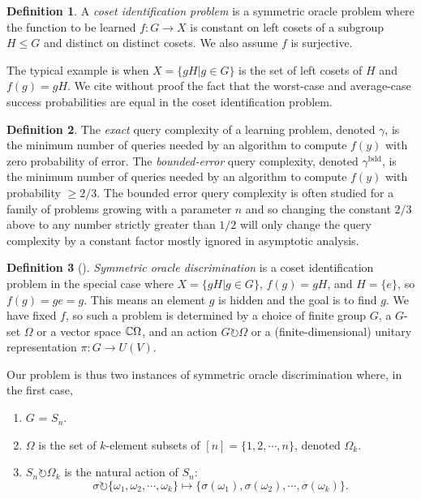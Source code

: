 \documentclass[12pt,twoside]{reedthesis}
\theoremstyle{plain}   %
\theoremstyle{definition}
\newtheorem{defn}{Definition}[section]
\theoremstyle{remark}
\numberwithin{equation}{section}
\def\acts{\circlearrowright} %
\begin{document}
  \begin{defn}
    A \emph{coset identification problem} is a symmetric oracle problem where
    the function to be learned $f: G \to X$ is constant on left cosets of a subgroup $H \leq G$ and distinct on distinct cosets.
    We also assume $f$ is surjective.
  \end{defn}
    The typical example is when $X = \{gH | g \in G\}$ is the set of left cosets of $H$ and $f(g) = gH$.
    We cite without proof the fact that the worst-case and average-case success probabilities are equal in the coset identification problem.
  \begin{defn}
    The \emph{exact}
    query complexity of a learning problem, denoted $\gamma$, is the minimum number of queries needed by an algorithm
    to compute $f (y)$ with zero probability of error. The \emph{bounded-error} query complexity, denoted $\gamma^{\mathrm{bdd}}$, is the minimum
    number of queries needed by an algorithm to compute $f (y)$ with probability $\geq 2/3$. The bounded
    error query complexity is often studied for a family of problems growing with a parameter $n$ and
    so changing the constant $2/3$ above to any number strictly greater than $1/2$ will only change the
    query complexity by a constant factor mostly ignored in asymptotic analysis.
  \end{defn}
  \begin{defn}[{\cite[Section 4]{copeland}}]
    \emph{Symmetric oracle discrimination} is a coset identification problem in the special case where $X = \{gH | g \in G\}$, $f(g) = gH$, and $H = \{e\}$, so $f(g) = g e = g$.
    This means an element $g$ is hidden and the goal is to find $g$.
    We have fixed $f$, so such a problem is determined by a choice of finite group $G$, a $G$-set $\Omega$ or a vector space $\mathbb{C} \Omega$, and an action $G \acts \Omega$ or a (finite-dimensional) unitary representation $\pi: G \to U(V)$.
  \end{defn}
  Our problem is thus two instances of symmetric oracle discrimination where, in the first case,
  \begin{enumerate}
  \item $G$ = $S_n$.
  \item $\Omega$ is the set of $k$-element subsets of $[n] = \{ 1, 2, \cdots, n\}$, denoted $\Omega_k$.
  \item $S_n \acts \Omega_k$ is the natural action of $S_n$:
    \[\sigma \acts \{ \omega_1, \omega_2, \cdots, \omega_k \} \mapsto \{ \sigma(\omega_1), \sigma(\omega_2), \cdots, \sigma(\omega_k)\}.\]
  \end{enumerate}
\end{document}
